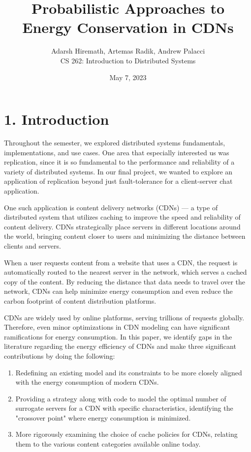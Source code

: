 \documentclass[
	a4paper, %
	10pt, %
	unnumberedsections, %
	twoside, %
]{LTJournalArticle}
\title{Probabilistic Approaches to 
\\ Energy Conservation in CDNs} %
\author{%
	Adarsh Hiremath, Artemas Radik, Andrew Palacci \\
	CS 262: Introduction to Distributed Systems \\
}
\date{May 7, 2023}
\begin{document}
\maketitle %


\section{1. Introduction}

Throughout the semester, we explored distributed systems fundamentals, implementations, and use cases. One area that especially interested us was replication, since it is so fundamental to the performance and reliability of a variety of distributed systems. In our final project, we wanted to explore an application of replication beyond just fault-tolerance for a client-server chat application.

One such application is content delivery networks (CDNs) --- a type of distributed system that utilizes caching to improve the speed and reliability of content delivery. CDNs strategically place servers in different locations around the world, bringing content closer to users and minimizing the distance between clients and servers.

When a user requests content from a website that uses a CDN, the request is automatically routed to the nearest server in the network, which serves a cached copy of the content. By reducing the distance that data needs to travel over the network, CDNs can help minimize energy consumption and even reduce the carbon footprint of content distribution platforms.

CDNs are widely used by online platforms, serving trillions of requests globally. Therefore, even minor optimizations in CDN modeling can have significant ramifications for energy consumption. In this paper, we identify gaps in the literature regarding the energy efficiency of CDNs and make three significant contributions by doing the following:

\begin{enumerate}
    \item Redefining an existing model and its constraints to be more closely aligned with the energy consumption of modern CDNs.
    \item Providing a strategy along with code to model the optimal number of surrogate servers for a CDN with specific characteristics, identifying the "crossover point" where energy consumption is minimized.
    \item More rigorously examining the choice of cache policies for CDNs, relating them to the various content categories available online today.
\end{enumerate}
\end{document}
